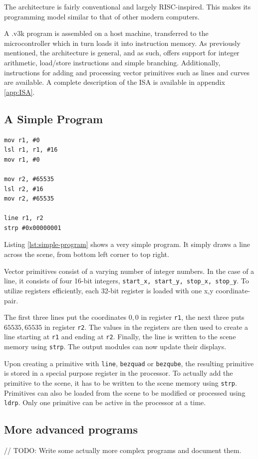 The \vthreek architecture is fairly conventional and largely RISC-inspired.
This makes its programming model similar to that of other modern computers.

A .v3k program is assembled on a host machine, transferred to the microcontroller which in turn loads it into instruction memory.
As previously mentioned, the \vthreek architecture is general, and as such, offers support for integer arithmetic, load/store instructions and simple branching.
Additionally, instructions for adding and processing vector primitives such as lines and curves are available.
A complete description of the \vthreek ISA is available in appendix \ref{app:ISA}.

\subsection{A Simple \vthreek Program}

\begin{lstlisting}[label=lst:simple-program]
mov r1, #0
lsl r1, r1, #16
mov r1, #0

mov r2, #65535
lsl r2, #16
mov r2, #65535

line r1, r2
strp #0x00000001
\end{lstlisting}

Listing \ref{lst:simple-program} shows a very simple \vthreek program.
It simply draws a line across the scene, from bottom left corner to top right.

Vector primitives consist of a varying number of integer numbers.
In the case of a line, it consists of four 16-bit integers, \texttt{start\_x, start\_y, stop\_x, stop\_y}.
To utilize registers efficiently, each 32-bit register is loaded with one x,y coordinate-pair.

The first three lines put the coordinates $0,0$ in register \texttt{r1}, the next three puts $65535,65535$ in register \texttt{r2}.
The values in the registers are then used to create a line starting at \texttt{r1} and ending at \texttt{r2}.
Finally, the line is written to the scene memory using \texttt{strp}.
The output modules can now update their displays.

Upon creating a primitive with \texttt{line}, \texttt{bezquad} or \texttt{bezqube}, the resulting primitive is stored in a special purpose register in the processor.
To actually add the primitive to the scene, it has to be written to the scene memory using \texttt{strp}.
Primitives can also be loaded from the scene to be modified or processed using \texttt{ldrp}.
Only one primitive can be active in the processor at a time.

\subsection{More advanced programs}

// TODO: Write some actually more complex programs and document them.
